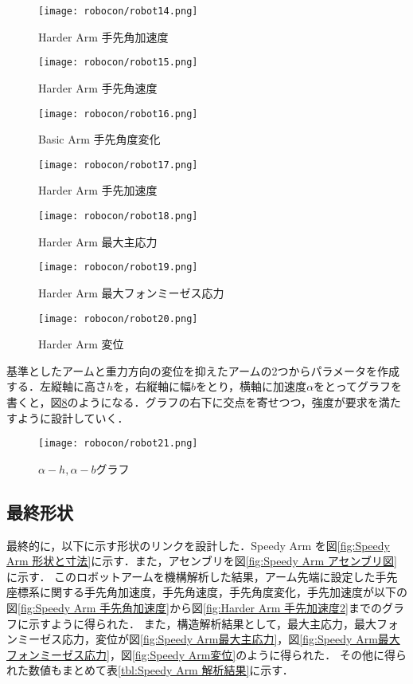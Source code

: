 \documentclass[10pt,b5paper,papersize,dvipdfmx]{jsbook}
\begin{document}
\begin{figure}[htbp]
  \centering
  \texttt{[image: robocon/robot14.png]}
  \caption{Harder Arm 手先角加速度}
  \label{fig:Harder Arm 手先角加速度}
\end{figure}
\begin{figure}[htbp]
  \centering
  \texttt{[image: robocon/robot15.png]}
  \caption{Harder Arm 手先角速度}
  \label{fig:Harder Arm 手先角速度}
\end{figure}
\begin{figure}[htbp]
  \centering
  \texttt{[image: robocon/robot16.png]}
  \caption{Basic Arm 手先角度変化}
  \label{fig:Basic Arm 手先角度変化}
\end{figure}
\begin{figure}[htbp]
  \centering
  \texttt{[image: robocon/robot17.png]}
  \caption{Harder Arm 手先加速度}
  \label{fig:Harder Arm 手先加速度}
\end{figure}
\begin{figure}[htbp]
  \centering
  \texttt{[image: robocon/robot18.png]}
  \caption{Harder Arm 最大主応力}
  \label{fig:Harder Arm 最大主応力}
\end{figure}
\begin{figure}[htbp]
  \centering
  \texttt{[image: robocon/robot19.png]}
  \caption{Harder Arm 最大フォンミーゼス応力}
  \label{fig:Harder Arm 最大フォンミーゼス応力}
\end{figure}
\begin{figure}[htbp]
  \centering
  \texttt{[image: robocon/robot20.png]}
  \caption{Harder Arm 変位}
  \label{fig:Harder Arm 変位}
\end{figure}
基準としたアームと重力方向の変位を抑えたアームの2つからパラメータを作成する．左縦軸に高さ$h$を，右縦軸に幅$b$をとり，横軸に加速度$\alpha$をとってグラフを書くと，図\ref{fig:alpha-h, alpha-b グラフ}のようになる．グラフの右下に交点を寄せつつ，強度が要求を満たすように設計していく．
\begin{figure}[htbp]
  \centering
  \texttt{[image: robocon/robot21.png]}
  \caption{$\alpha-h, \alpha-b$グラフ}
  \label{fig:alpha-h, alpha-b グラフ}
\end{figure}

\clearpage
\subsection{最終形状}
最終的に，以下に示す形状のリンクを設計した．Speedy Arm を図\ref{fig:Speedy Arm 形状と寸法}に示す．また，アセンブリを図\ref{fig:Speedy Arm アセンブリ図}に示す．
このロボットアームを機構解析した結果，アーム先端に設定した手先座標系に関する手先角加速度，手先角速度，手先角度変化，手先加速度が以下の図\ref{fig:Speedy Arm 手先角加速度}から図\ref{fig:Harder Arm 手先加速度2}までのグラフに示すように得られた．
また，構造解析結果として，最大主応力，最大フォンミーゼス応力，変位が図\ref{fig:Speedy Arm最大主応力}，図\ref{fig:Speedy Arm最大フォンミーゼス応力}，図\ref{fig:Speedy Arm変位}のように得られた．
その他に得られた数値もまとめて表\ref{tbl:Speedy Arm 解析結果}に示す．
\end{document}

